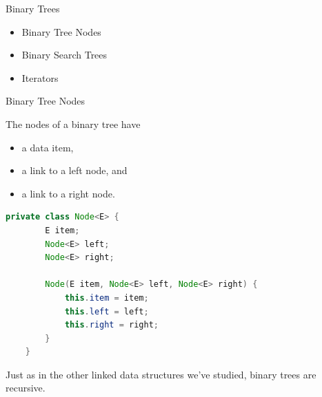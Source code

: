 \documentclass{beamer}
\author[Chris Simpkins] 
{Christopher Simpkins \\\texttt{chris.simpkins@gatech.edu}}
\institute[Georgia Tech] %
\date[CS 1331]{}
\begin{document}
\begin{frame}
  \titlepage
\end{frame}

\begin{frame}[fragile]{Binary Trees}


\begin{itemize}
\item Binary Tree Nodes
\item Binary Search Trees
\item Iterators
\end{itemize}


\end{frame}



\begin{frame}[fragile]{Binary Tree Nodes}


The nodes of a binary tree have
\begin{itemize}
\item a data item,
\item a link to a left node, and
\item a link to a right node.
\end{itemize}

\begin{lstlisting}[language=Java]
    private class Node<E> {
        E item;
        Node<E> left;
        Node<E> right;
        
        Node(E item, Node<E> left, Node<E> right) {
            this.item = item;
            this.left = left;
            this.right = right;
        }
    }
\end{lstlisting}

Just as in the other linked data structures we've studied, binary trees are recursive.


\end{frame}
\end{document}
